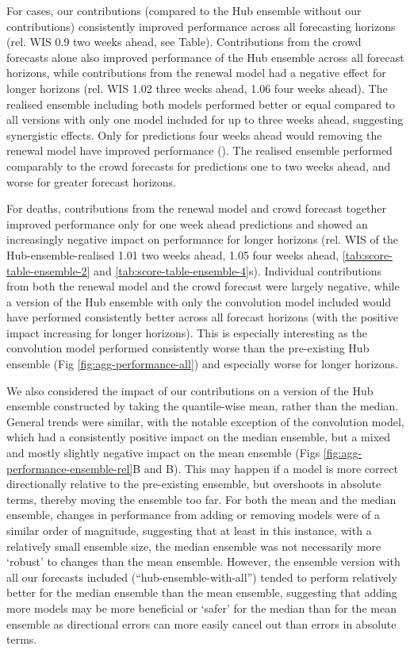 \documentclass[10pt,letterpaper]{article}
\begin{document}
For cases, our contributions (compared to the Hub ensemble without our
contributions) consistently improved performance across all forecasting
horizons (rel. WIS 0.9 two weeks ahead, see
 Table). Contributions from the
crowd forecasts alone also improved performance of the Hub ensemble
across all forecast horizons, while contributions from the renewal model
had a negative effect for longer horizons (rel. WIS 1.02 three weeks
ahead, 1.06 four weeks ahead). The realised ensemble including both
models performed better or equal compared to all versions with only one
model included for up to three weeks ahead, suggesting synergistic
effects. Only for predictions four weeks ahead would removing the
renewal model have improved performance
(). The realised ensemble performed
comparably to the crowd forecasts for predictions one to two weeks
ahead, and worse for greater forecast horizons.

For deaths, contributions from the renewal model and crowd forecast
together improved performance only for one week ahead predictions and
showed an increasingly negative impact on performance for longer
horizons (rel. WIS of the Hub-ensemble-realised 1.01 two weeks ahead,
1.05 four weeks ahead, \ref{tab:score-table-ensemble-2} and
\ref{tab:score-table-ensemble-4}s). Individual contributions from both
the renewal model and the crowd forecast were largely negative, while a
version of the Hub ensemble with only the convolution model included
would have performed consistently better across all forecast horizons
(with the positive impact increasing for longer horizons). This is
especially interesting as the convolution model performed consistently
worse than the pre-existing Hub ensemble (Fig
\ref{fig:agg-performance-all}) and especially worse for longer horizons.

We also considered the impact of our contributions on a version of the
Hub ensemble constructed by taking the quantile-wise mean, rather than
the median. General trends were similar, with the notable exception of
the convolution model, which had a consistently positive impact on the
median ensemble, but a mixed and mostly slightly negative impact on the
mean ensemble (Figs \ref{fig:agg-performance-ensemble-rel}B and
B). This may happen if a
model is more correct directionally relative to the pre-existing
ensemble, but overshoots in absolute terms, thereby moving the ensemble
too far. For both the mean and the median ensemble, changes in
performance from adding or removing models were of a similar order of
magnitude, suggesting that at least in this instance, with a relatively
small ensemble size, the median ensemble was not necessarily more
`robust' to changes than the mean ensemble. However, the ensemble
version with all our forecasts included (``hub-ensemble-with-all'')
tended to perform relatively better for the median ensemble than the
mean ensemble, suggesting that adding more models may be more beneficial
or `safer' for the median than for the mean ensemble as directional
errors can more easily cancel out than errors in absolute terms.
\end{document}
